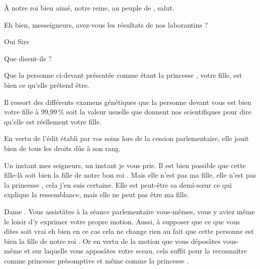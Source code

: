 \scene

\StageDirII{\roi, \reine, \nobleOne, \nobleTwo, \nobleTree, \ela, \vladimir, \huissier, \greffier, \kingsgards}





\begin{drama}
  \nobleOnespeaks À notre roi bien aimé, notre reine, au peuple de \campprincipal{}, salut.

  \roispeaks Eh bien, messeigneurs, avez-vous les résultats de nos laborantins ?

  \nobleTwospeaks Oui Sire

  \roispeaks Que disent-ils ?

  \nobleTreespeaks Que la personne ci-devant présentée comme étant la princesse \princesse{}, votre fille, est bien ce qu’elle prétend être.


  \nobleOnespeaks Il ressort des différents examens génétiques que la personne devant vous est bien votre fille à 99,99\,\% soit la valeur usuelle que donnent nos scientifiques pour dire qu’elle est réellement votre fille.

  \nobleTwospeaks En vertu de l’édit établi par vos soins lors de la cession parlementaire, elle jouit bien de tous les droits dûs à son rang.

  \reinespeaks {} Un instant mes seigneurs, un instant je vous prie. Il est bien possible que cette fille-là soit bien la fille de notre bon roi \roi. Mais elle n’est pas ma fille, elle n’est pas la princesse \princesse{}, cela j’en suis certaine. Elle est peut-être sa demi-sœur ce qui explique la ressemblance, mais elle ne peut pas être ma fille.

  \nobleTreespeaks Dame \reine. Vous assistâtes à la séance parlementaire vous-mêmes, vous y aviez même le loisir d’y exprimer votre propre motion. Aussi, à supposer que ce que vous dites soit vrai  eh bien en ce cas cela ne change rien au fait que cette personne est bien la fille de notre roi \roi. Or en vertu de la motion que vous déposâtes vous-même et sur laquelle vous apposâtes votre sceau, cela suffit pour la reconnaitre comme princesse présomptive et même comme la princesse \princesse{}.


\end{drama}
